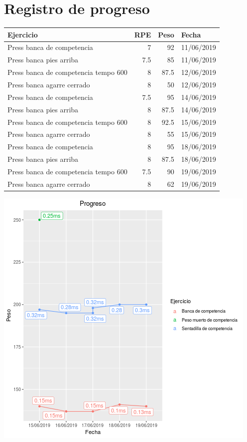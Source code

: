 \documentclass[11pt]{article}
\begin{document}
\section{Registro de progreso}
\label{sec:org131323a}
\begin{center}
\label{tab:orgf85952b}
\begin{tabular}{lrrl}
Ejercicio & RPE & Peso & Fecha\\
\hline
Press banca de competencia & 7 & 92 & 11/06/2019\\
Press banca pies arriba & 7.5 & 85 & 11/06/2019\\
Press banca de competencia tempo 600 & 8 & 87.5 & 12/06/2019\\
Press banca agarre cerrado & 8 & 50 & 12/06/2019\\
Press banca de competencia & 7.5 & 95 & 14/06/2019\\
Press banca pies arriba & 8 & 87.5 & 14/06/2019\\
Press banca de competencia tempo 600 & 8 & 92.5 & 15/06/2019\\
Press banca agarre cerrado & 8 & 55 & 15/06/2019\\
Press banca de competencia & 8 & 95 & 18/06/2019\\
Press banca pies arriba & 8 & 87.5 & 18/06/2019\\
Press banca de competencia tempo 600 & 7.5 & 90 & 19/06/2019\\
Press banca agarre cerrado & 8 & 62 & 19/06/2019\\
\end{tabular}
\end{center}
\begin{center}
\includegraphics[width=.9\linewidth]{tmp.png}
\end{center}
\end{document}
